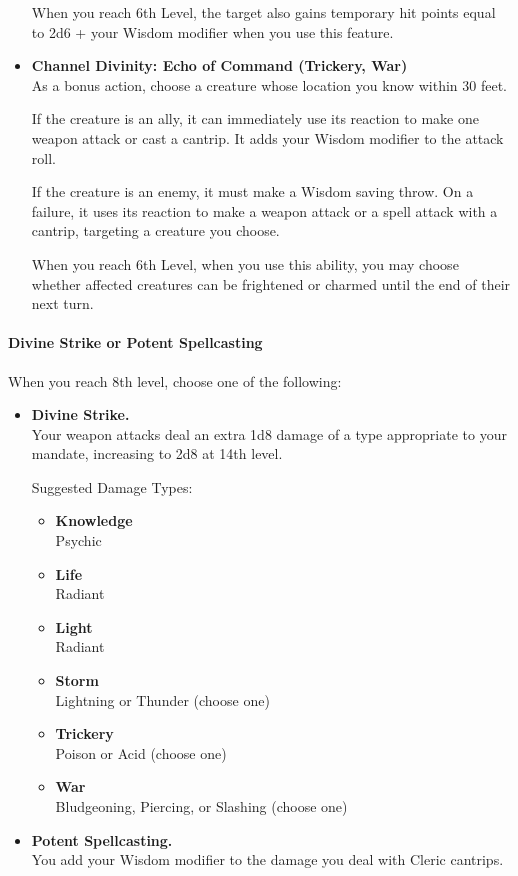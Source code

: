 \begin{itemize}
  When you reach 6th Level, the target also gains temporary hit points
  equal to 2d6 + your Wisdom modifier when you use this feature.
\item
  \textbf{Channel Divinity: Echo of Command (Trickery, War)}\\
  As a bonus action, choose a creature whose location you know within 30
  feet.

  If the creature is an ally, it can immediately use its reaction to
  make one weapon attack or cast a cantrip. It adds your Wisdom modifier
  to the attack roll.

  If the creature is an enemy, it must make a Wisdom saving throw. On a
  failure, it uses its reaction to make a weapon attack or a spell
  attack with a cantrip, targeting a creature you choose.

  When you reach 6th Level, when you use this ability, you may choose
  whether affected creatures can be frightened or charmed until the end
  of their next turn.
\end{itemize}

\paragraph{Divine Strike or Potent
Spellcasting}\label{Sacred_Mandate_divine-strike-or-potent-spellcasting}

When you reach 8th level, choose one of the following:

\begin{itemize}
\item
  \textbf{Divine Strike.}\\
  Your weapon attacks deal an extra 1d8 damage of a type appropriate to
  your mandate, increasing to 2d8 at 14th level.

  Suggested Damage Types:

  \begin{itemize}
  \item
    \textbf{Knowledge}\\
    Psychic
  \item
    \textbf{Life}\\
    Radiant
  \item
    \textbf{Light}\\
    Radiant
  \item
    \textbf{Storm}\\
    Lightning or Thunder (choose one)
  \item
    \textbf{Trickery}\\
    Poison or Acid (choose one)
  \item
    \textbf{War}\\
    Bludgeoning, Piercing, or Slashing (choose one)
  \end{itemize}
\item
  \textbf{Potent Spellcasting.}\\
  You add your Wisdom modifier to the damage you deal with Cleric
  cantrips.
\end{itemize}

